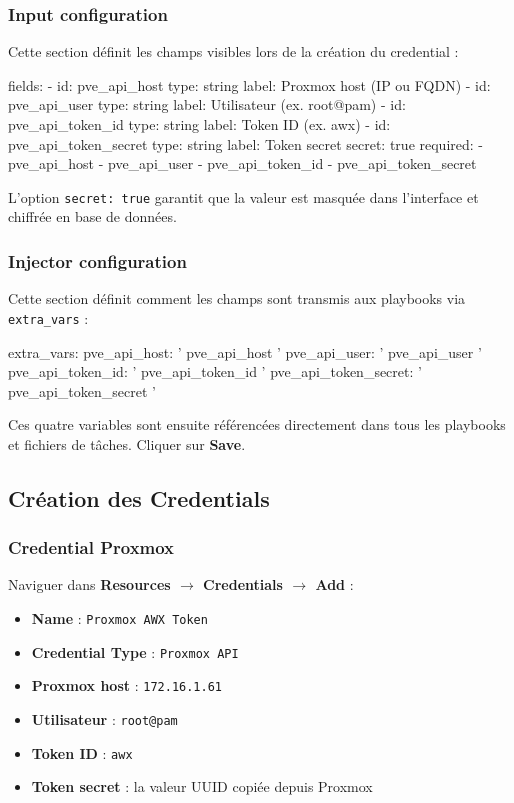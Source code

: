 \documentclass[a4paper]{article}
\newcommand{\cmd}[1]{\texttt{#1}}
\begin{document}
\subsubsection*{Input configuration}

Cette section définit les champs visibles lors de la création du credential :

\begin{yamlcode}
fields:
  - id: pve_api_host
    type: string
    label: Proxmox host (IP ou FQDN)
  - id: pve_api_user
    type: string
    label: Utilisateur (ex. root@pam)
  - id: pve_api_token_id
    type: string
    label: Token ID (ex. awx)
  - id: pve_api_token_secret
    type: string
    label: Token secret
    secret: true
required:
  - pve_api_host
  - pve_api_user
  - pve_api_token_id
  - pve_api_token_secret
\end{yamlcode}

L'option \cmd{secret: true} garantit que la valeur est masquée dans l'interface et chiffrée en base de données.

\subsubsection*{Injector configuration}

Cette section définit comment les champs sont transmis aux playbooks via \cmd{extra\_vars} :

\begin{yamlcode}
extra_vars:
  pve_api_host:         '{{ pve_api_host }}'
  pve_api_user:         '{{ pve_api_user }}'
  pve_api_token_id:     '{{ pve_api_token_id }}'
  pve_api_token_secret: '{{ pve_api_token_secret }}'
\end{yamlcode}

Ces quatre variables sont ensuite référencées directement dans tous les playbooks et fichiers de tâches. Cliquer sur \textbf{Save}.

\subsection{Création des Credentials}

\subsubsection*{Credential Proxmox}

Naviguer dans \textbf{Resources \(\to\) Credentials \(\to\) Add} :

\begin{itemize}
  \item \textbf{Name} : \cmd{Proxmox AWX Token}
  \item \textbf{Credential Type} : \cmd{Proxmox API}
  \item \textbf{Proxmox host} : \cmd{172.16.1.61}
  \item \textbf{Utilisateur} : \cmd{root@pam}
  \item \textbf{Token ID} : \cmd{awx}
  \item \textbf{Token secret} : la valeur UUID copiée depuis Proxmox
\end{itemize}
\end{document}
